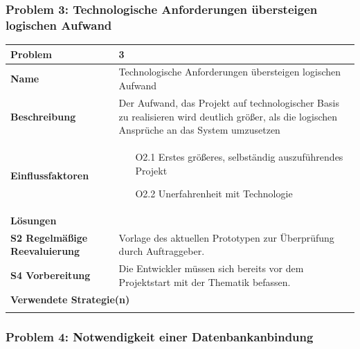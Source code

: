 \documentclass[fontsize=12pt,paper=a4,twoside]{scrartcl}
\begin{document}
\subsubsection{Problem 3: Technologische Anforderungen übersteigen logischen Aufwand}
\begin{tabularx}{\textwidth}{|p{6cm}|X|}
 \hline
 \textbf{Problem} & 3 \\\hline
 \textbf{Name} & Technologische Anforderungen übersteigen logischen Aufwand\\\hline 
 \textbf{Beschreibung} & Der Aufwand, das Projekt auf technologischer Basis zu realisieren wird deutlich größer, als die logischen Ansprüche an das System umzusetzen\\\hline
 \textbf{Einflussfaktoren} &
 \begin{itemize}
 \item[O2.1] Erstes größeres, selbständig auszuführendes Projekt
 \item[O2.2] Unerfahrenheit mit Technologie
 \end{itemize}\\\hline
\multicolumn{2}{|l|}{\textbf{Lösungen}} \\\hline

\textbf{S2 Regelmäßige Reevaluierung} & Vorlage des aktuellen Prototypen zur Überprüfung durch Auftraggeber. \\
\textbf{S4 Vorbereitung} & Die Entwickler müssen sich bereits vor dem Projektstart mit der Thematik befassen. \\\hline
\multicolumn{2}{|l|}{\textbf{Verwendete Strategie(n)}} \\\hline
    & \\\hline

\end{tabularx}
\newpage


\subsubsection{Problem 4: Notwendigkeit einer Datenbankanbindung}
\end{document}
